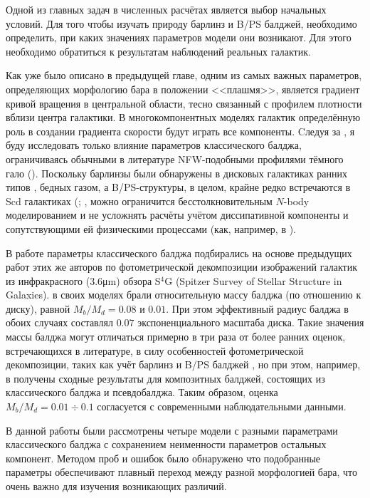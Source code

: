 \documentclass{trlnotes}
\begin{document}
Одной из главных задач в численных расчётах является выбор начальных условий. Для того чтобы изучать
природу барлинз и B/PS балджей, необходимо определить, при каких значениях параметров модели они возникают. Для
этого необходимо обратиться к результатам наблюдений реальных галактик.

Как уже было описано в предыдущей главе, одним из самых важных параметров, определяющих морфологию бара в положении <<плашмя>>,
является градиент кривой вращения в центральной области, тесно связанный с профилем плотности вблизи центра галактики. В многокомпонентных моделях галактик определённую роль в создании градиента скорости будут играть все компоненты. Cледуя за \citet{salo2017}, я буду исследовать только влияние параметров классического балджа, 
ограничиваясь обычными в литературе NFW-подобными профилями тёмного гало (\cite{navarro1996}). Поскольку барлинзы были обнаружены в 
дисковых галактиках ранних типов \citep{laurikainen2011}, бедных газом, а B/PS-структуры, в целом, крайне редко 
встречаются в Scd галактиках (\cite{erwin2017}; \cite{li2017a}, можно ограничится бесстолкновительным $N$-body моделированием и не усложнять расчёты учётом 
диссипативной компоненты и сопутствующими ей физическими процессами (как, например, в \cite{athanassoula2015}). 

В работе \citet{salo2017} параметры классического балджа подбирались на основе предыдущих работ этих же авторов по 
фотометрической декомпозиции изображений галактик из инфракрасного (3.6\thinspace μm) обзора S${}^4$G (Spitzer Survey of 
Stellar Structure in Galaxies). \citep{salo2015} в своих моделях брали относительную массу балджа (по отношению к диску), равной  
$M_b/M_d = 0.08$ и $0.01$. При этом эффективный радиус балджа в обоих случаях составлял $0.07$ экспоненциального 
масштаба диска. Такие значения массы балджа могут отличаться примерно в три раза от более ранних оценок, 
встречающихся в литературе, в силу особенностей фотометрической декомпозиции, таких как учёт барлинз и B/PS 
балджей \citep{laurikainen2016a}, но при этом, например, в \citet{erwin2015} получены сходные результаты для 
композитных балджей, состоящих из классического балджа и псевдобалджа. Таким образом, оценка $M_b/M_d = 0.01 \div 
0.1$ согласуется с современными наблюдательными данными.

В данной работы были рассмотрены четыре модели с разными параметрами классического балджа с сохранением 
неименности параметров остальных компонент. Методом проб и ошибок было обнаружено что подобранные параметры обеспечивают 
плавный переход между разной морфологией бара, что очень важно для изучения возникающих различий. 
\end{document}
